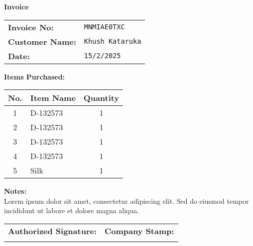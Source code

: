 \documentclass{article}
\begin{document}
        \begin{center}
            {\Huge \textbf{Invoice}} \\[1em]
        \end{center}

        \noindent
        \begin{tabular}{@{}ll@{}}
            \textbf{Invoice No:} & \texttt{MNMIAE0TXC} \\
            \textbf{Customer Name:} & \texttt{Khush Kataruka} \\
            \textbf{Date:} & \texttt{15/2/2025} \\
        \end{tabular}

        \vspace{2em}

        \textbf{Items Purchased:} \\

        \begin{tabular}{|c|l|c|}
            \hline
            \textbf{No.} & \textbf{Item Name} & \textbf{Quantity} \\
            \hline
            1 & D-132573 & 1 \\ \hline
2 & D-132573 & 1 \\ \hline
3 & D-132573 & 1 \\ \hline
4 & D-132573 & 1 \\ \hline
5 & Silk & 1 \\ \hline
        \end{tabular}

        \vspace{2em}

        \noindent
        \textbf{Notes:} \\
        Lorem ipsum dolor sit amet, consectetur adipiscing elit. Sed do eiusmod tempor incididunt ut labore et dolore magna aliqua.
        \vspace{1em}

        \noindent
        \begin{tabular}{@{}p{}p{}@{}}
            \textbf{Authorized Signature:} & \textbf{Company Stamp:} \\
            \vspace{2cm} & \vspace{2cm} \\
        \end{tabular}

        
\end{document}
